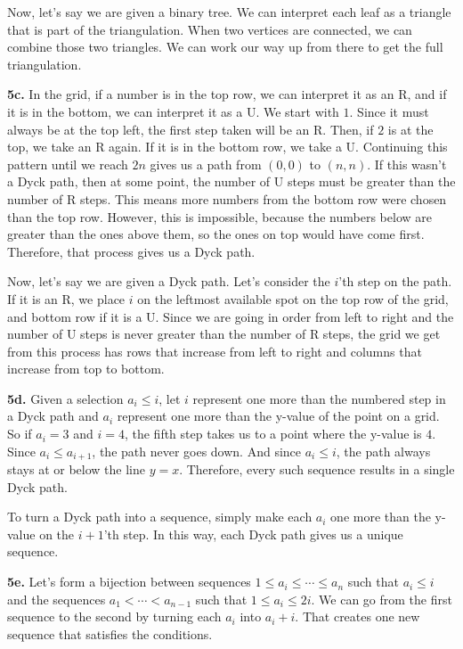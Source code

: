 \documentclass{article}
\begin{document}
Now, let's say we are given a binary tree. We can interpret each leaf as a triangle that is part of the triangulation. When two vertices are connected, we can combine those two triangles. We can work our way up from there to get the full triangulation.
\newline

\textbf{5c.} In the grid, if a number is in the top row, we can interpret it as an R, and if it is in the bottom, we can interpret it as a U. We start with $1$. Since it must always be at the top left, the first step taken will be an R. Then, if $2$ is at the top, we take an R again. If it is in the bottom row, we take a U. Continuing this pattern until we reach $2n$ gives us a path from $(0, 0)$ to $(n, n)$. If this wasn't a Dyck path, then at some point, the number of U steps must be greater than the number of R steps. This means more numbers from the bottom row were chosen than the top row. However, this is impossible, because the numbers below are greater than the ones above them, so the ones on top would have come first. Therefore, that process gives us a Dyck path.
\newline

Now, let's say we are given a Dyck path. Let's consider the $i$'th step on the path. If it is an R, we place $i$ on the leftmost available spot on the top row of the grid, and bottom row if it is a U. Since we are going in order from left to right and the number of U steps is never greater than the number of R steps, the grid we get from this process has rows that increase from left to right and columns that increase from top to bottom.
\newline

\textbf{5d.} Given a selection $a_i \le i$, let $i$ represent one more than the numbered step in a Dyck path and $a_i$ represent one more than the y-value of the point on a grid. So if $a_i = 3$ and $i = 4$, the fifth step takes us to a point where the y-value is $4$. Since $a_i \le a_{i + 1}$, the path never goes down. And since $a_i \le i$, the path always stays at or below the line $y = x$. Therefore, every such sequence results in a single Dyck path.
\newline

To turn a Dyck path into a sequence, simply make each $a_i$ one more than the y-value on the $i + 1$'th step. In this way, each Dyck path gives us a unique sequence.
\newline

\textbf{5e.} Let's form a bijection between sequences $1 \le a_i \le \cdots \le a_n$ such that $a_i \le i$ and the sequences $a_1 < \cdots < a_{n - 1}$ such that $1 \le a_i \le 2i$. We can go from the first sequence to the second by turning each $a_i$ into $a_i + i$. That creates one new sequence that satisfies the conditions.
\newline
\end{document}
